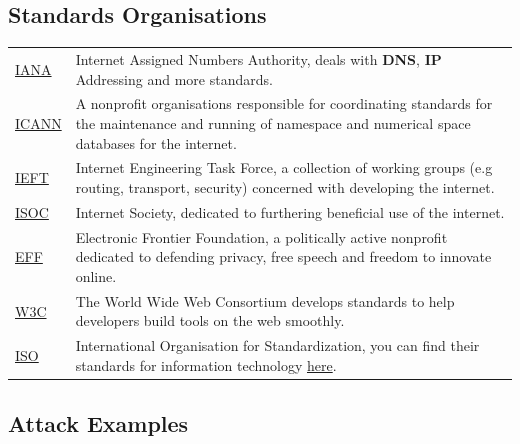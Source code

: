 \subsection{Standards Organisations}
\begin{center}
    \begin{tabular}{l p{}}
        \href{https://www.iana.org/}{IANA}            & Internet Assigned Numbers Authority, deals with \textbf{DNS}, \textbf{IP} Addressing and more standards.                                                               \\
        \href{https://www.icann.org/}{ICANN}          & A nonprofit organisations responsible for coordinating standards for the maintenance and running of namespace and numerical space databases for the internet.          \\
        \href{https://www.ietf.org/}{IEFT}            & Internet Engineering Task Force, a collection of working groups (e.g routing, transport, security) concerned with developing the internet.                             \\
        \href{https://www.internetsociety.org/}{ISOC} & Internet Society, dedicated to furthering beneficial use of the internet.                                                                                              \\
        \href{https://www.eff.org/}{EFF}              & Electronic Frontier Foundation, a politically active nonprofit dedicated to defending privacy, free speech and freedom to innovate online.                             \\
        \href{https://www.w3.org/standards/}{W3C}     & The World Wide Web Consortium develops standards to help developers build tools on the web smoothly.                                                                   \\
        \href{https://www.iso.org/}{ISO}              & International Organisation for Standardization, you can find their standards for information technology \href{https://www.iso.org/committee/45020/x/catalogue/}{here}. \\
    \end{tabular}
\end{center}
\subsection{Attack Examples}

